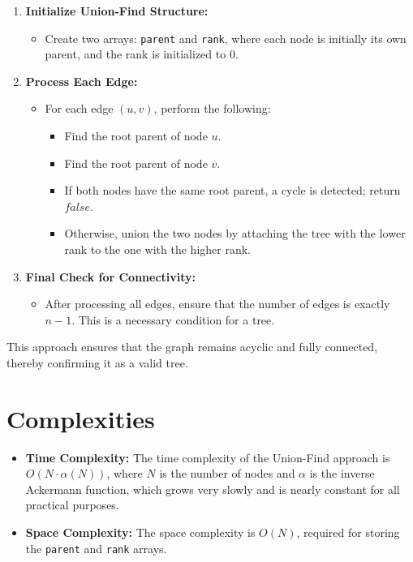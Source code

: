 \begin{enumerate}
    \item \textbf{Initialize Union-Find Structure:}
    \begin{itemize}
        \item Create two arrays: \texttt{parent} and \texttt{rank}, where each node is initially its own parent, and the rank is initialized to 0.
    \end{itemize}
    
    \item \textbf{Process Each Edge:}
    \begin{itemize}
        \item For each edge \((u, v)\), perform the following:
        \begin{itemize}
            \item Find the root parent of node \( u \).
            \item Find the root parent of node \( v \).
            \item If both nodes have the same root parent, a cycle is detected; return \( false \).
            \item Otherwise, union the two nodes by attaching the tree with the lower rank to the one with the higher rank.
        \end{itemize}
    \end{itemize}
    
    \item \textbf{Final Check for Connectivity:}
    \begin{itemize}
        \item After processing all edges, ensure that the number of edges is exactly \( n - 1 \). This is a necessary condition for a tree.
    \end{itemize}
\end{enumerate}

This approach ensures that the graph remains acyclic and fully connected, thereby confirming it as a valid tree.


\section*{Complexities}

\begin{itemize}
    \item \textbf{Time Complexity:} The time complexity of the Union-Find approach is \( O(N \cdot \alpha(N)) \), where \( N \) is the number of nodes and \( \alpha \) is the inverse Ackermann function, which grows very slowly and is nearly constant for all practical purposes.
    
    \item \textbf{Space Complexity:} The space complexity is \( O(N) \), required for storing the \texttt{parent} and \texttt{rank} arrays.
\end{itemize}

